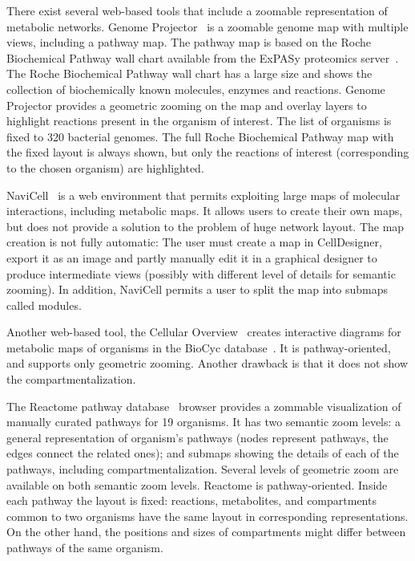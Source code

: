\documentclass{bmcart}
\begin{document}
There exist several web-based tools that include a zoomable representation of metabolic networks. Genome Projector~\cite{Arakawa2009} is a zoomable genome map with multiple views, including a pathway map. The pathway map is based on the Roche Biochemical Pathway wall chart available from the ExPASy proteomics server~\cite{Gasteiger2003}. The Roche Biochemical Pathway wall chart has a large size and shows the collection of biochemically known molecules, enzymes and reactions. Genome Projector provides a geometric zooming on the map and overlay layers to highlight reactions present in the organism of interest. The list of organisms is fixed to 320 bacterial genomes. The full Roche Biochemical Pathway map with the fixed layout is always shown, but only the reactions of interest (corresponding to the chosen organism) are highlighted.

NaviCell~\cite{Kuperstein2013} is a web environment that permits exploiting large maps of molecular interactions, including metabolic maps. It allows users to create their own maps, but does not provide a solution to the problem of huge network layout. The map creation is not fully automatic: The user must create a map in CellDesigner, export it as an image and partly manually edit it in a graphical designer to produce intermediate views (possibly with different level of details for semantic zooming). In addition, NaviCell permits a user to split the map into submaps called modules.

Another web-based tool, the Cellular Overview~\cite{Latendresse2011} creates interactive diagrams for metabolic maps of organisms in the BioCyc database~\cite{Caspi2012}. It is pathway-oriented, and supports only geometric zooming. Another drawback is that it does not show the compartmentalization.

The Reactome pathway database~\cite{Milacic2012, Croft2013} browser provides a zommable visualization of manually curated pathways for 19 organisms. It has two semantic zoom levels: a general representation of organism's pathways (nodes represent pathways, the edges connect the related ones); and submaps showing the details of each of the pathways, including compartmentalization. Several levels of geometric zoom are available on both semantic zoom levels. Reactome is pathway-oriented. Inside each pathway the layout is fixed: reactions, metabolites, and compartments common to two organisms have the same layout in corresponding representations. On the other hand, the positions and sizes of compartments might differ between pathways of the same organism.
\end{document}
